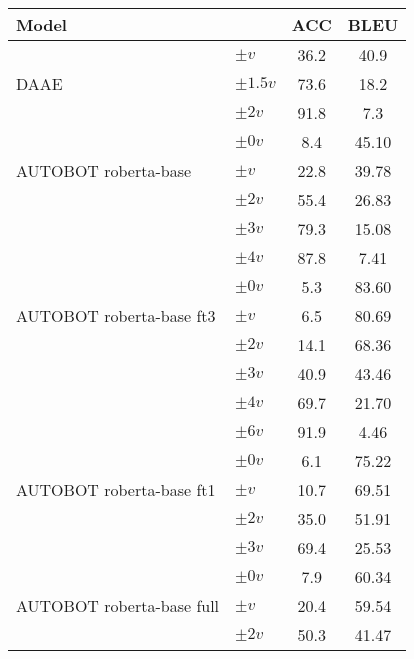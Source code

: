\begin{table}[]
\centering  
\footnotesize
\begin{tabular}{ll|cc} 
\toprule
\textbf{Model} &  & \textbf{ACC} & \textbf{BLEU} \\
\midrule
\multirow{3}{*}{DAAE} & $\pm v$ & 36.2 & 40.9 \\
 & $\pm 1.5v$ & 73.6 & 18.2 \\
 & $\pm 2v$ & 91.8 & 7.3 \\
\hline
\multirow{3}{2cm}{AUTOBOT roberta-base} 
 & $\pm 0v$ & 8.4 & 45.10  \\
 & $\pm v$ & 22.8 & 39.78 \\
 & $\pm 2v$ & 55.4 & 26.83 \\
 & $\pm 3v$ & 79.3 & 15.08  \\
 & $\pm 4v$ & 87.8 & 7.41  \\
\hline
\multirow{3}{2cm}{AUTOBOT roberta-base ft3} 
 & $\pm 0v$ & 5.3 &  83.60 \\
 & $\pm v$ & 6.5 & 80.69 \\
 & $\pm 2v$ & 14.1 & 68.36 \\
 & $\pm 3v$ & 40.9 & 43.46  \\
 & $\pm 4v$ & 69.7 & 21.70  \\
 & $\pm 6v$ & 91.9 & 4.46 \\
\hline
\multirow{3}{2cm}{AUTOBOT roberta-base ft1} 
 & $\pm 0v$ & 6.1 & 75.22 \\
 & $\pm v$ & 10.7 & 69.51 \\
 & $\pm 2v$ & 35.0 & 51.91 \\
 & $\pm 3v$ & 69.4 & 25.53  \\\hline
\multirow{3}{2cm}{AUTOBOT roberta-base full} 
 & $\pm 0v$ & 7.9 & 60.34  \\
 & $\pm v$ & 20.4 & 59.54 \\
 & $\pm 2v$ & 50.3 & 41.47  \\
\hline

\end{tabular}
\end{table}
